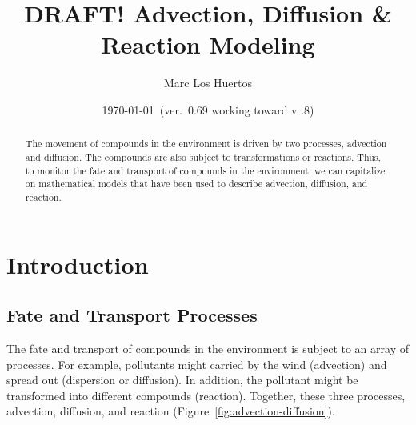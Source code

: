 \documentclass{tufte-handout}\usepackage[]{graphicx}\usepackage[]{xcolor}
\title{DRAFT! Advection, Diffusion \& Reaction Modeling}
\author{Marc Los Huertos}
\date{\today~(ver.~0.69 working toward v .8)}
\begin{document}
\maketitle%
\begin{abstract}
The movement of compounds in the environment is driven by two processes, advection and diffusion. The compounds are also subject to transformations or reactions. Thus, to monitor the fate and transport of compounds in the environment, we can capitalize on mathematical models that have been used to describe advection, diffusion, and reaction. %

\end{abstract}

\section{Introduction}

\subsection{Fate and Transport Processes}

The fate and transport of compounds in the environment is subject to an array of processes. For example, pollutants might carried by the wind (advection) and spread out (dispersion or diffusion). In addition, the pollutant might be transformed into different compounds (reaction). Together, these three processes, advection, diffusion, and reaction (Figure~\ref{fig:advection-diffusion}).%

\end{document}
